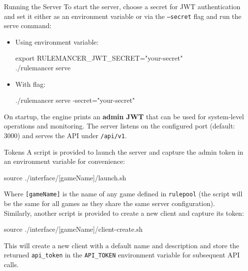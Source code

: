 \documentclass[aspectratio=169]{beamer}
\begin{document}
\begin{frame}{Running the Server}
To start the server, choose a secret for JWT authentication and set it either as an environment variable or via the
\texttt{--secret} flag and run the serve command:
\vspace{0.3cm}
\begin{itemize}
\item Using environment variable:
\begin{block}{
export RULEMANCER\_JWT\_SECRET="your-secret" \\
./rulemancer serve
}
\end{block}
\vspace{0.3cm}
\item With flag:
\begin{block}{
  ./rulemancer serve -secret="your-secret"
}
\end{block}
\end{itemize}
\vspace{0.3cm}
On startup, the engine prints an \textbf{admin JWT} that can be used for system-level operations and monitoring.
The server listens on the configured port (default: 3000) and serves the API under \texttt{/api/v1}. \\

\end{frame}


\begin{frame}{Tokens}
A script is provided to launch the server and capture the admin token in an environment variable for convenience:
\begin{block}{
source ./interface/[gameName]/launch.sh
}
\end{block}
Where \texttt{[gameName]} is the name of any game defined in \texttt{rulepool} (the script will be the same for all games
as they share the same server configuration). \\
\vspace{0.3cm}
Similarly, another script is provided to create a new client and capture its token:
\begin{block}{
source ./interface/[gameName]/client-create.sh
}
\end{block}
This will create a new client with a default name and description and store the returned \texttt{api\_token} 
in the \texttt{API\_TOKEN} environment variable for subsequent API calls.
\end{frame}
\end{document}
